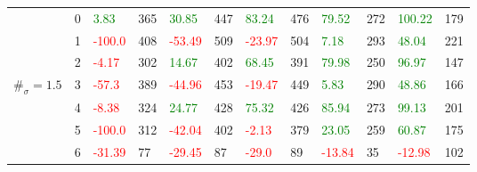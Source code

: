 \begin{table}[!htb]
\begin{adjustwidth}{-0.8in}{-0.9in}
\begin{tabular}{|p{4em}|p{2em}|p{3em}|p{3em}|p{3em}|p{3em}|p{3em}|p{3em}|p{3em}|p{3em}|p{3em}|p{3em}|}
            & 0 & \textcolor{green}{3.83} & 365 & \textcolor{green}{30.85} & 447 & \textcolor{green}{83.24} & 476 & \textcolor{green}{79.52} & 272 & \textcolor{green}{100.22} & 179\\\cline{3-12}
            & 1 & \textcolor{red}{-100.0} & 408 & \textcolor{red}{-53.49} & 509 & \textcolor{red}{-23.97} & 504 & \textcolor{green}{7.18} & 293 & \textcolor{green}{48.04} & 221\\\cline{3-12}
            & 2 & \textcolor{red}{-4.17} & 302 & \textcolor{green}{14.67} & 402 & \textcolor{green}{68.45} & 391 & \textcolor{green}{79.98} & 250 & \textcolor{green}{96.97} & 147\\\cline{3-12}
            $\#_{\sigma}=1.5$ & 3 & \textcolor{red}{-57.3} & 389 & \textcolor{red}{-44.96} & 453 & \textcolor{red}{-19.47} & 449 & \textcolor{green}{5.83} & 290 & \textcolor{green}{48.86} & 166\\\cline{3-12}
            & 4 & \textcolor{red}{-8.38} & 324 & \textcolor{green}{24.77} & 428 & \textcolor{green}{75.32} & 426 & \textcolor{green}{85.94} & 273 & \textcolor{green}{99.13} & 201\\\cline{3-12}
            & 5 & \textcolor{red}{-100.0} & 312 & \textcolor{red}{-42.04} & 402 & \textcolor{red}{-2.13} & 379 & \textcolor{green}{23.05} & 259 & \textcolor{green}{60.87} & 175\\\cline{3-12}
            & 6 & \textcolor{red}{-31.39} & 77 & \textcolor{red}{-29.45} & 87 & \textcolor{red}{-29.0} & 89 & \textcolor{red}{-13.84} & 35 & \textcolor{red}{-12.98} & 102\\\hline\hline
            

\end{tabular}
\end{adjustwidth}
\end{table}
